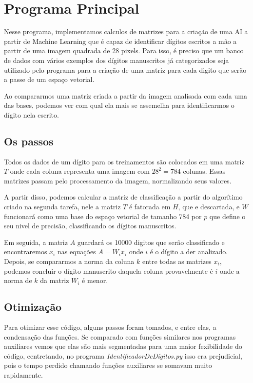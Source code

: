 \documentclass[a4paper, 12pt]{article}
\begin{document}
\section{Programa Principal}

    Nesse programa, implementamos calculos de matrizes para a criação de uma AI a partir de Machine Learning que é capaz de identificar dígitos escritos a mão a partir de uma imagem quadrada de 28 pixels.
    Para isso, é preciso que um banco de dados com vários exemplos dos dígitos manuscritos já categorizados seja utilizado pelo programa para a criação de uma matriz para cada digito que serão a passe de um espaço vetorial.

    Ao compararmos uma matriz criada a partir da imagem analisada com cada uma das bases, podemos ver com qual ela mais se assemelha para identificarmos o dígito nela escrito.

\subsection{Os passos}

    Todos os dados de um dígito para os treinamentos são colocados em uma matriz $T$ onde cada coluna representa uma imagem com $28^2 = 784$ colunas.
    Essas matrizes passam pelo processamento da imagem, normalizando seus valores.

    A partir disso, podemos calcular a matriz de classificação a partir do algorítimo criado na segunda tarefa, nele a matriz $T$ é fatorada em $H$, que e descartada, e $W$ funcionará como uma base do espaço vetorial de tamanho 784 por $p$ que define o seu nivel de precisão, classificando os dígitos manuscritos.

    Em seguida, a matriz $A$ guardará os 10000 digitos que serão classificado e encontraremos $x_{i}$ nas equações $A = W_{i} x_{i}$ onde $i$ é o dígito a der analizado.
    Depois, se compararmos a norma da coluna $k$ entre todas as matrizes $x_{i}$, podemos concluir o dígito manuscrito daquela coluna provavelmente é $i$ onde a norma de $k$ da matriz $W_{i}$ é menor.

\subsection{Otimização}

    Para otimizar esse código, alguns passos foram tomados, e entre elas, a condensação das funções.
    Se comparado com funções similares nos programas auxiliares vemos que elas são mais segmentadas para uma maior fexibilidade do código, eentretando, no programa \textit{IdentificadorDeDígitos.py} isso era prejudicial, pois o tempo perdido chamando funções auxiliares se somavam muito rapidamente.
\end{document}
